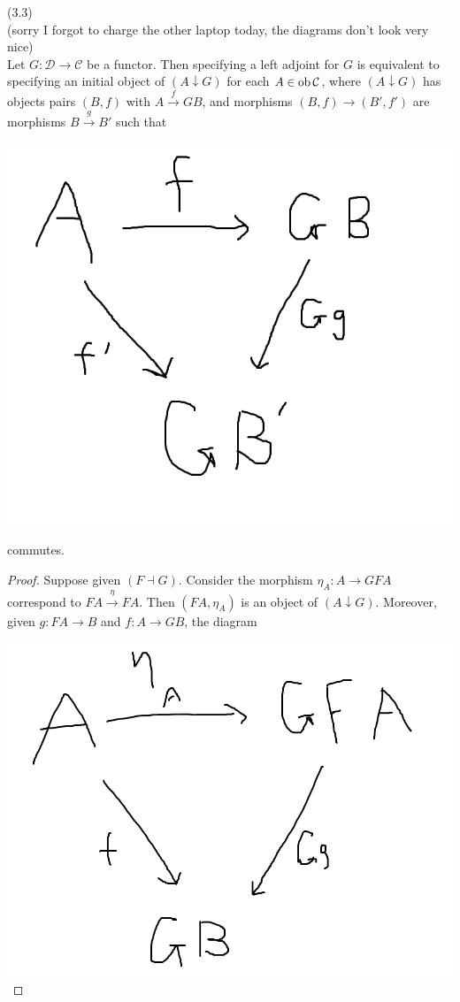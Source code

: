 \documentclass[a4paper]{article}
\begin{document}
\begin{thm} (3.3)\\
    (sorry I forgot to charge the other laptop today, the diagrams don't look very nice)\\
    Let $G:\mathcal{D} \to \mathcal{C}$ be a functor. Then specifying a left adjoint for $G$ is equivalent to specifying an initial object of $(A \downarrow G)$ for each $A \in \operatorname{ob} \mathcal{C}$, where $(A \downarrow G)$ has objects pairs $(B,f)$ with $A \xrightarrow{f} GB$, and morphisms $(B,f) \to (B',f')$ are morphisms $B \xrightarrow{g} B'$ such that 

    \includegraphics[scale=0.4]{image/Cat_02.png}

    commutes.
    \begin{proof}
        Suppose given $(F \dashv G)$. Consider the morphism $\eta_A:A \to GFA$ correspond to $FA \xrightarrow{\eta} FA$. Then $(FA,\eta_A)$ is an object of $(A \downarrow G)$. Moreover, given $g:FA \to B$ and $f:A \to GB$, the diagram 

        \includegraphics[scale=0.4]{image/Cat_03.png}


\end{proof}
\end{thm}
\end{document}
